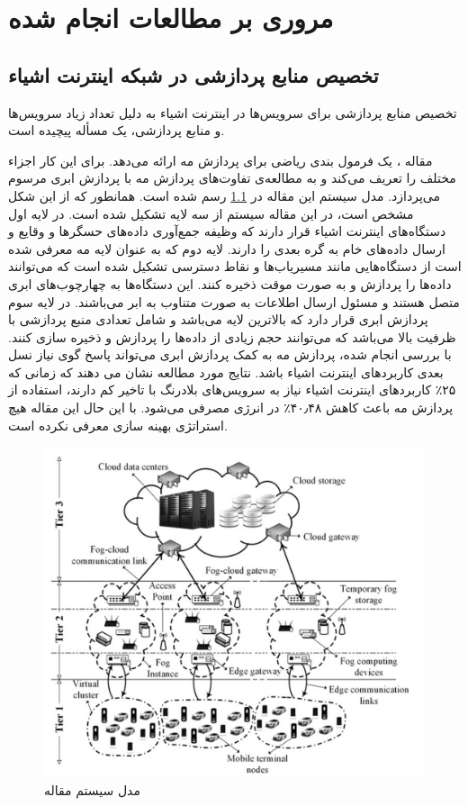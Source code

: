 \chapter{مروری بر مطالعات انجام شده}\label{chap:literature_review}
  \thispagestyle{empty}
  \section{تخصیص منابع پردازشی در شبکه اینترنت اشیاء}
    تخصیص منابع پردازشی برای سرویس‌ها در اینترنت اشیاء به دلیل تعداد زیاد سرویس‌ها و منابع پردازشی، یک مسأله پیچیده است.

    مقاله \cite{sarkar2016theoretical}، یک فرمول بندی ریاضی برای پردازش مه ارائه می‌دهد.
    برای این کار اجزاء مختلف را تعریف می‌کند و به مطالعه‌ی تفاوت‌های پردازش مه با پردازش ابری مرسوم می‌پردازد.
    مدل سیستم این مقاله در \cref{fig:chapter_2:system_model_sarkar2016theoretical} رسم شده است.
    همانطور که از این شکل مشخص است، در این مقاله سیستم از سه لایه تشکیل شده است.
    در لایه اول دستگاه‌های اینترنت اشیاء قرار دارند که وظیفه جمع‌آوری داده‌های حسگر‌ها و وقایع و ارسال داده‌های خام به گره بعدی را دارند.
    لایه دوم که به عنوان لایه مه معرفی شده است از دستگاه‌هایی مانند مسیریاب‌ها و نقاط دسترسی تشکیل شده است که می‌توانند داده‌ها را پردازش و به صورت موقت ذخیره کنند.
    این دستگاه‌ها به چهارچوب‌های ابری متصل هستند و مسئول ارسال اطلاعات به صورت متناوب به ابر می‌باشند.
    در لایه سوم پردازش ابری قرار دارد که بالاترین لایه می‌باشد و شامل تعدادی منبع پردازشی با ظرفیت بالا می‌باشد که می‌توانند حجم زیادی از داده‌‌ها را پردازش و ذخیره سازی کنند.
    با بررسی انجام شده، پردازش مه به کمک پردازش ابری می‌تواند پاسخ گوی نیاز نسل بعدی کاربرد‌های اینترنت اشیاء باشد.
    نتایج مورد مطالعه نشان می دهند که زمانی که ۲۵٪ کاربرد‌های اینترنت اشیاء نیاز به سرویس‌های بلادرنگ با تاخیر کم دارند، استفاده از پردازش مه باعث کاهش ۴۰٫۴۸٪ در انرژی مصرفی می‌شود.
    با این حال این مقاله هیچ استراتژی بهینه سازی معرفی نکرده است.

    \begin{figure}[h]
      \centerline{\includegraphics[width=12cm]{graphics/chapter_2/system_model_sarkar2016theoretical}}
      \caption{مدل سیستم مقاله \cite{sarkar2016theoretical}}
      \label{fig:chapter_2:system_model_sarkar2016theoretical}
    \end{figure}

